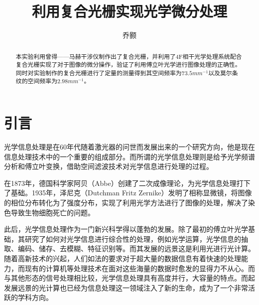 \documentclass[aps,pre,12pt,preprint,onecolumn,showpacs,showkeys,UTF8]{revtex4-1}
\begin{document}
\title{\bf\heiti{}利用复合光栅实现光学微分处理\vspace{15mm}}
\author{\fangsong 乔颢\vspace{2mm}}
\begin{abstract}
	\vspace{10mm}
	\begin{spacing}{1.5}
		\songti{}
		本实验利用曾得——马赫干涉仪制作出了复合光栅，并利用了4F相干光学处理系统配合复合光栅实现了对于图像的微分操作，验证了利用傅立叶光学进行图像处理的正确性。同时对实验制作的复合光栅进行了定量的测量得到其空间频率为$73.5mm^{-1}$以及莫尔条纹的空间频率为$2.98mm^{-1}$。
	\end{spacing}
\end{abstract}

\maketitle

\section{引言}

光学信息处理是在60年代随着激光器的问世而发展出来的一个研究方向，他是现在信息处理技术中的一个重要的组成部分。而所谓的光学信息处理则是给予光学频谱分析和傅立叶变换，借助空间滤波技术对光学信息进行处理的过程。

在1873年，德国科学家阿贝（Abbe）创建了二次成像理论，为光学信息处理打下了基础。1935年，泽尼克（Dutchman Fritz Zernike）发明了相称显微镜，将图像的相位分布转化为了强度分布，实现了利用光学方法进行了图像的处理，解决了染色导致生物细胞死亡的问题。

此后，光学信息处理作为一门新兴科学得以蓬勃的发展。除了最初的傅立叶光学基础，其研究了如何对光学信息进行综合性的处理，例如光学运算，光学信息的抽取、编码、储存、去模糊、特征识别等。而其发展的远景这是利用光进行光计算。随着高新技术的兴起，人们如法的要求对于超大量的数据信息有着快速的处理能力，而现有的计算机等处理技术在面对这些海量的数据时愈发的显得力不从心。而与其他形态的信号处理相比较，光学信息处理具有高度并行，大容量的特点。\cite{Book2}而起发展远景的光计算也已经为信息处理这一领域注入了新的生命，成为了一个非常活跃的学科方向。
\end{document}
